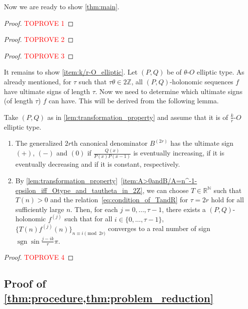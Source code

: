 \documentclass[a4paper,UKenglish,cleveref,autoref,thm-restate]{lipics-v2021}
\newcommand{\R}{\mathbb{R}}
\newcommand{\N}{\mathbb{N}}
\newcommand{\Z}{\mathbb{Z}}
\DeclareMathOperator{\sgn}{sgn}
\begin{document}
Now we are ready to show \cref{thm:main}. 

\begin{proof}\textcolor{red}{TOPROVE 1}\end{proof}

\begin{proof}\textcolor{red}{TOPROVE 2}\end{proof}

\begin{proof}\textcolor{red}{TOPROVE 3}\end{proof}

It remains to show \eqref{item:k/r-O_elliptic}. Let $(P, Q)$ be of $\theta$-$O$ elliptic type. As already mentioned, for $\tau$ such that $\tau \theta \in 2 \Z$, all $(P, Q)$-holonomic sequences $f$ have ultimate signs of length $\tau$. Now we need to determine which ultimate signs (of length $\tau$) $f$ can have. This will be derived from the following lemma. 

\begin{lemma} \label{lem:Tg^j_converge}
Take $(P, Q)$ as in \cref{lem:transformation_property} and assume that it is of $\frac{k}r$-$O$ elliptic type. 
\begin{enumerate}[(1)]
\item \label{item:sgnR=sgnq}
The generalized $2r$th canonical denominator $B^{(2r)}$ has the ultimate sign $(+)$, $(-)$ and $(0)$ if $\frac{Q(x)}{P(x)P(x-1)}$ is eventually increasing, if it is eventually decreasing and if it is constant, respectively. 

\item \label{item:Tf^j}
By \cref{lem:transformation_property}~\eqref{item:A>0andB/A=n^-1-epsilon_iff_Otype_and_tautheta_in_2Z}, we can choose $T \in \R^{\N}$ such that $T(n) > 0$ and the relation~\eqref{eq:condition_of_TandR} for $\tau = 2r$ hold for all sufficiently large $n$. Then, for each $j = 0, \dots, \tau-1$, there exists a $(P, Q)$-holonomic $f^{(j)}$ such that for all $i \in \{0, \dots, \tau-1\}$, $\{ T(n)f^{(j)}(n) \}_{n \equiv i \pmod{2r}}$ converges to a real number of sign $\sgn \sin \frac{j - ik}r \pi$.
\end{enumerate}
\end{lemma}


\begin{proof}\textcolor{red}{TOPROVE 4}\end{proof}



\subsection{Proof of \cref{thm:procedure,thm:problem_reduction}} \label{sec:proof_of_thm:procedure}
\end{document}
